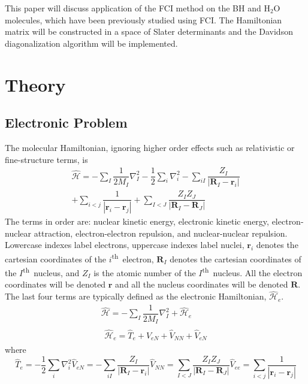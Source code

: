 \documentclass[final,3p,times,twocolumn]{elsarticle}
\newcommand{\ssth}{\textsuperscript{th}}
\newcommand{\ham}{\hat{\mathcal{H}}}
\begin{document}
This paper will discuss application of the FCI method on the BH and H$_2$O molecules, which have been previously studied using FCI.\cite{cccbdb,handy-1983} The Hamiltonian matrix will be constructed in a space of Slater determinants and the Davidson diagonalization algorithm will be implemented. 

\section{Theory}
\subsection{Electronic Problem} \label{sec:elproblem}
The molecular Hamiltonian, ignoring higher order effects such as relativistic or fine-structure terms, is
\begin{equation}
\begin{gathered}
\hat{\mathcal H} = - \sum_I \dfrac{1}{2M_I} \nabla_I^2 -\dfrac{1}{2} \sum_i \nabla_i^2 - \sum_{iI} \dfrac{Z_I}{|\mathbf{R}_I - \mathbf{r}_i|} \\
+ \sum_{i < j} \dfrac{1}{|\mathbf{r}_i - \mathbf{r}_j|} + \sum_{I < J} \dfrac{Z_IZ_J}{|\mathbf{R}_I - \mathbf{R}_J|}
\end{gathered}
\end{equation}
The terms in order are: nuclear kinetic energy, electronic kinetic energy, electron-nuclear attraction, electron-electron repulsion, and nuclear-nuclear repulsion. Lowercase indexes label electrons, uppercase indexes label nuclei, $\mathbf{r}_i$ denotes the cartesian coordinates of the $i$\ssth\ electron, $\mathbf{R}_I$ denotes the cartesian coordinates of the $I$\ssth\ nucleus, and $Z_I$ is the atomic number of the $I$\ssth\ nucleus. All the electron coordinates will be denoted $\mathbf{r}$ and all the nucleus coordinates will be denoted $\mathbf{R}$. The last four terms are typically defined as the electronic Hamiltonian, $\ham_e$.
\begin{gather}
\hat{\mathcal H} = - \sum_I \dfrac{1}{2M_I} \nabla_I^2 + \ham_e \\
\begin{gathered}\label{eq:hame}
\ham_e = \hat T_e + \hat V_{eN} + \hat V_{NN} + \hat V_{eN}
\end{gathered}
\end{gather}
where
\begin{subequations}
\begin{equation}
\hat T_e = -\dfrac{1}{2} \sum_i \nabla_i^2 
\end{equation}
\begin{equation}
\hat V_{eN} = - \sum_{iI} \dfrac{Z_I}{|\mathbf{R}_I - \mathbf{r}_i|}
\end{equation}
\begin{equation} \label{eq:vnn}
\hat V_{NN} = \sum_{I < J} \dfrac{Z_IZ_J}{|\mathbf{R}_I - \mathbf{R}_J|}
\end{equation}
\begin{equation}
\hat V_{ee} = \sum_{i < j} \dfrac{1}{|\mathbf{r}_i - \mathbf{r}_j|}
\end{equation}
\end{subequations}
\end{document}
